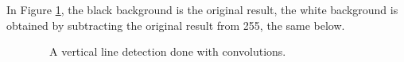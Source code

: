 In Figure \ref{line:detect4}, the black background is the original result, the white background is obtained by subtracting the original result from 255, the same below.
\begin{figure}[H]
	\centering
	\caption{~~A vertical line detection done with convolutions.}
	\label{line:detect4}
\end{figure}




